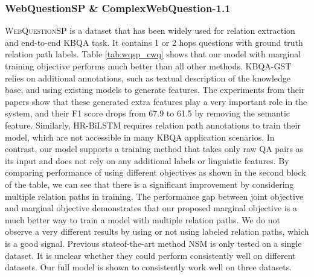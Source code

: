 \subsubsection{WebQuestionSP \& ComplexWebQuestion-1.1}

\textsc{WebQuestionSP} is a dataset that has been widely used for relation extraction and end-to-end KBQA task. It contains 1 or 2 hops questions with ground truth relation path labels. Table \ref{tab:wqsp_cwq} shows that our model with marginal training objective performs much better than all other methods. KBQA-GST \cite{DBLP:conf/ijcai/LanW019} relies on additional annotations, such as textual description of the knowledge base, and using existing models to generate features. The experiments from their papers show that these generated extra features play a very important role in the system, and their F1 score drops from 67.9 to 61.5 by removing the semantic feature. Similarly, HR-BiLSTM requires relation path annotations to train their model, which are not accessible in many KBQA application scenarios. In contrast, our model supports a training method that takes only raw QA pairs as its input and does not rely on any additional labels or linguistic features. By comparing performance of using different objectives as shown in the second block of the table, we can see that there is a significant improvement by considering multiple relation paths in training. The performance gap between joint objective and marginal objective demonstrates that our proposed marginal objective is a much better way to train a model with multiple relation paths. We do not observe a very different results by using or not using labeled relation paths, which is a good signal. 
Previous stateof-the-art method NSM is only tested on a single dataset. It is unclear whether they could perform consistently well on different datasets. Our full model is shown to consistently work well on three datasets.

